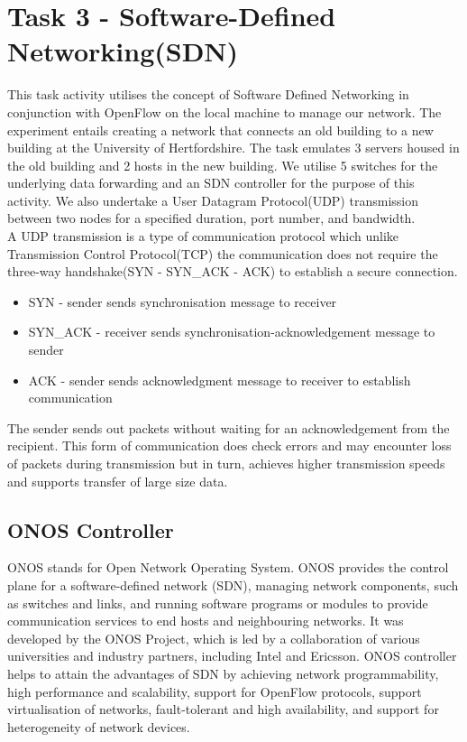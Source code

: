 \documentclass{article}
\begin{document}
\section{Task 3 - Software-Defined Networking(SDN)}
This task activity utilises the concept of Software Defined Networking in conjunction with OpenFlow on the local machine to manage our network. The experiment entails creating a network that connects an old building to a new building at the University of Hertfordshire. The task emulates 3 servers housed in the old building and 2 hosts in the new building. We utilise 5 switches for the underlying data forwarding and an SDN controller for the purpose of this activity. We also undertake a User Datagram Protocol(UDP) transmission between two nodes for a specified duration, port number, and bandwidth. \\ A UDP transmission is a type of communication protocol which unlike Transmission Control Protocol(TCP)\citep{CONRAD201263} the communication does not require the three-way handshake(SYN - SYN\_ACK - ACK) to establish a secure connection.
	\begin{itemize}
		\item SYN - sender sends synchronisation message to receiver
		\item SYN\_ACK - receiver sends synchronisation-acknowledgement message to sender
		\item ACK - sender sends acknowledgment message to receiver to establish communication
	\end{itemize}  
The sender sends out packets without waiting for an acknowledgement from the recipient. This form of communication does check errors and may encounter loss of packets during transmission but in turn, achieves higher transmission speeds and supports transfer of large size data.
\subsection{ONOS Controller}
ONOS stands for Open Network Operating System. ONOS provides the control plane for a software-defined network (SDN), managing network components, such as switches and links, and running software programs or modules to provide communication services to end hosts and neighbouring networks. It was developed by the ONOS Project, which is led by a collaboration of various universities and industry partners, including Intel and Ericsson. ONOS controller helps to attain the advantages of SDN by achieving network programmability, high performance and scalability, support for OpenFlow protocols, support virtualisation of networks, fault-tolerant and high availability, and support for heterogeneity of network devices.
\end{document}
